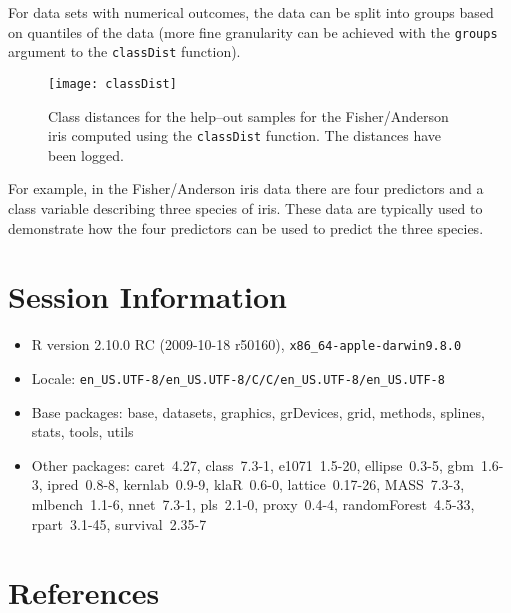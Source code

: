 \documentclass[12pt]{article}
\begin{document}
For data sets with numerical outcomes, the data can be split into groups based on quantiles of the data (more fine granularity can be achieved with the \texttt{groups} argument to the \texttt{classDist} function).

\begin{figure}
   \begin{center}		
      \texttt{[image: classDist]}
      \caption{Class distances for the help--out samples for the Fisher/Anderson iris computed using the \texttt{classDist} function. The distances have been logged.}
      \label{F:classDist} 
    \end{center}
\end{figure} 

For example, in the Fisher/Anderson iris data there are four predictors and a class variable describing three species of iris. These data are typically used to demonstrate how the four predictors can be used to predict the three species. 


\section{Session Information}

\begin{itemize}\raggedright
  \item R version 2.10.0 RC (2009-10-18 r50160), \verb|x86_64-apple-darwin9.8.0|
  \item Locale: \verb|en_US.UTF-8/en_US.UTF-8/C/C/en_US.UTF-8/en_US.UTF-8|
  \item Base packages: base, datasets, graphics, grDevices, grid,
    methods, splines, stats, tools, utils
  \item Other packages: caret~4.27, class~7.3-1, e1071~1.5-20,
    ellipse~0.3-5, gbm~1.6-3, ipred~0.8-8, kernlab~0.9-9, klaR~0.6-0,
    lattice~0.17-26, MASS~7.3-3, mlbench~1.1-6, nnet~7.3-1, pls~2.1-0,
    proxy~0.4-4, randomForest~4.5-33, rpart~3.1-45, survival~2.35-7
\end{itemize}
\section{References}
\end{document}
